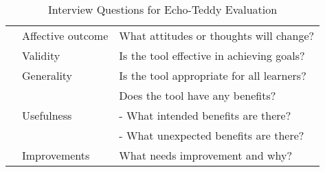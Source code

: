 \begin{table*}[hbt!]
\begin{tabular}{p{3cm}p{3cm}p{6cm}}
\cline{2-3}
 & Affective outcome & What attitudes or thoughts will change? \\
\cline{2-3}
 & Validity & Is the tool effective in achieving goals? \\
\cline{2-3}
 & Generality & Is the tool appropriate for all learners? \\
\cline{2-3}
 & \multirow{3}{*}{Usefulness} & Does the tool have any benefits? \\
 & & - What intended benefits are there? \\
 & & - What unexpected benefits are there? \\
\cline{2-3}
 & Improvements & What needs improvement and why? \\
\hline
\end{tabular}
\caption{Interview Questions for Echo-Teddy Evaluation}
\end{table*}
